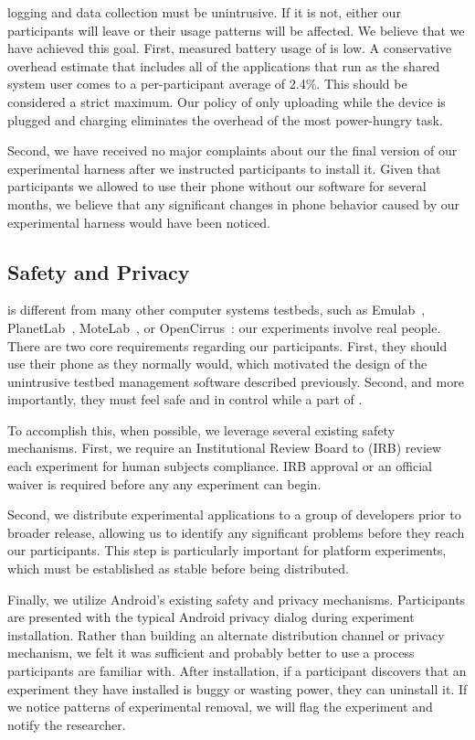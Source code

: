 \PhoneLab{} logging and data collection must be unintrusive. If it is not,
either our participants will leave or their usage patterns will be affected.
We believe that we have achieved this goal. First, measured battery usage of
\PhoneLab{} is low. A conservative overhead estimate that includes all of the
applications that run as the shared system user comes to a per-participant
average of 2.4\%. This should be considered a strict maximum. Our policy of
only uploading while the device is plugged and charging eliminates the
overhead of the most power-hungry task.

Second, we have received no major complaints about our the final version of
our \PhoneLab{} experimental harness after we instructed participants to
install it. Given that participants we allowed to use their phone without our
software for several months, we believe that any significant changes in phone
behavior caused by our experimental harness would have been noticed.

\subsection{Safety and Privacy}

\PhoneLab{} is different from many other computer systems testbeds, such as
Emulab~\cite{white:osdi:2002, emulab}, PlanetLab~\cite{peterson:ccr:2003,
planetlab}, MoteLab~\cite{werner-allen:ipsn:2005}, or
OpenCirrus~\cite{avetisyan:computer:2010, opencirrus}: our experiments involve
real people. There are two core requirements regarding our participants. First,
they should use their phone as they normally would, which motivated the design
of the unintrusive testbed management software described previously. Second, and
more importantly, they must feel safe and in control while a part of
\PhoneLab{}.

To accomplish this, when possible, we leverage several existing safety
mechanisms. First, we require an Institutional Review Board to (IRB) review
each \PhoneLab{} experiment for human subjects compliance. IRB approval or an
official waiver is required before any \PhoneLab{} any experiment can begin.

Second, we distribute experimental applications to a group of developers
prior to broader release, allowing us to identify any significant problems
before they reach our participants. This step is particularly important for
platform experiments, which must be established as stable before being
distributed.

Finally, we utilize Android's existing safety and privacy mechanisms.
Participants are presented with the typical Android privacy dialog during
experiment installation. Rather than building an alternate distribution
channel or privacy mechanism, we felt it was sufficient and probably better
to use a process participants are familiar with. After installation, if a
participant discovers that an experiment they have installed is buggy or
wasting power, they can uninstall it. If we notice patterns of experimental
removal, we will flag the experiment and notify the researcher.

